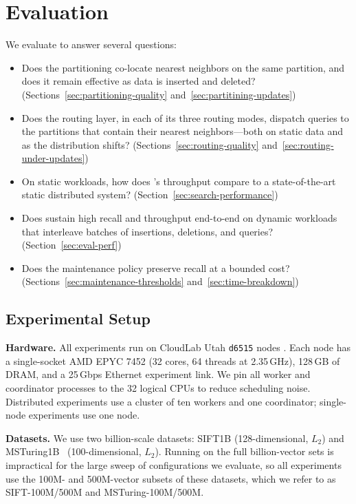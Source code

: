 \documentclass[sigconf,review,anonymous]{acmart}
\begin{document}
\section{Evaluation}
We evaluate \SystemName{} to answer several questions:
\begin{itemize}
    \item[\textbf{Q1.}] Does the partitioning co-locate nearest neighbors on the same partition, and does it remain effective as data is inserted and deleted? (Sections~\ref{sec:partitioning-quality} and~\ref{sec:partitining-updates})

    \item[\textbf{Q2.}] Does the routing layer, in each of its three routing modes, dispatch queries to the partitions that contain their nearest neighbors---both on static data and as the distribution shifts? (Sections~\ref{sec:routing-quality} and~\ref{sec:routing-under-updates})

    \item[\textbf{Q3.}] On static workloads, how does \SystemName{}'s throughput compare to a state-of-the-art static distributed system? (Section~\ref{sec:search-performance})

    \item[\textbf{Q4.}] Does \SystemName{} sustain high recall and throughput end-to-end on dynamic workloads that interleave batches of insertions, deletions, and queries? (Section~\ref{sec:eval-perf})

    \item[\textbf{Q5.}] Does the maintenance policy preserve recall at a bounded cost? (Sections~\ref{sec:maintenance-thresholds} and~\ref{sec:time-breakdown})
\end{itemize}

\subsection{Experimental Setup}
\label{sec:eval-setup}
\textbf{Hardware.} All experiments run on CloudLab Utah \texttt{d6515} nodes \cite{Duplyakin+:ATC19}. Each node has a single-socket AMD EPYC 7452 (32 cores, 64 threads at 2.35\,GHz), 128\,GB of DRAM, and a 25\,Gbps Ethernet experiment link. We pin all worker and coordinator processes to the 32 logical CPUs to reduce scheduling noise. Distributed experiments use a cluster of ten workers and one coordinator; single-node experiments use one node.

\textbf{Datasets.} We use two billion-scale datasets: SIFT1B\TODO{} (128-dimensional, $L_2$) and MSTuring1B~\cite{simhadri2022results} (100-dimensional, $L_2$). Running on the full billion-vector sets is impractical for the large sweep of configurations we evaluate, so all experiments use the 100M- and 500M-vector subsets of these datasets, which we refer to as SIFT-100M/500M and MSTuring-100M/500M.
\end{document}

